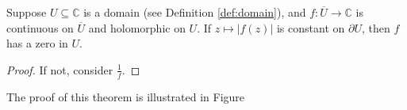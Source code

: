 \begin{corollary}
	Suppose $U \subseteq \mathbb{C}$ is a domain (see Definition \ref{def:domain}), and $f: \overline{U} \rightarrow \mathbb{C}$ is continuous on $\overline{U}$ and holomorphic on $U$. If $z \mapsto |f(z)|$ is constant on $\partial U$, then $f$ has a zero in $U$.
\end{corollary}
\begin{proof}
	If not, consider $\frac{1}{f}$.
\end{proof}
The proof of this theorem is illustrated in Figure
